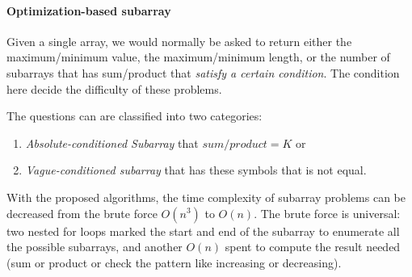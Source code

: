 \documentclass[../main.tex]{subfiles}
\begin{document}
\paragraph{Optimization-based subarray} 
Given a single array, we would normally be asked to return either the maximum/minimum value, the maximum/minimum length, or the number of subarrays that has sum/product that \textit{satisfy a certain condition}. The condition here decide the difficulty of these problems.

The questions can are classified into two categories:
\begin{enumerate}
    \item \textit{Absolute-conditioned Subarray} that $sum/product=K$ or 
    \item \textit{Vague-conditioned subarray} that has these symbols that is not equal.
\end{enumerate}

With the proposed algorithms, the time complexity of subarray problems can be decreased from the brute force $O(n^3)$ to $O(n)$. The brute force is universal: two nested for loops marked the start and end of the subarray to enumerate all the possible subarrays, and another $O(n)$ spent to compute the result needed (sum or product or check the pattern like increasing or decreasing). 

\end{document}
